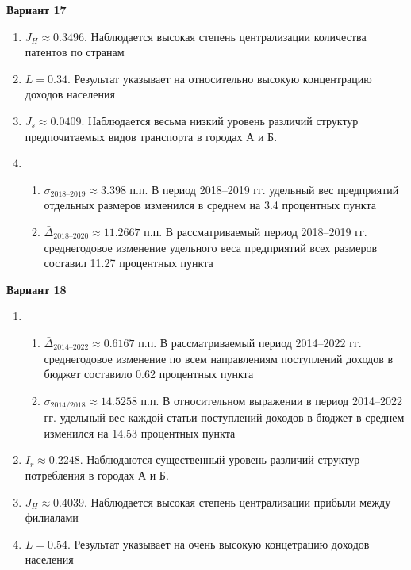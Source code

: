 \documentclass{article}
\begin{document}
\textbf{Вариант 17}
\begin{enumerate}
\item $J_H \approx 0.3496$. Наблюдается высокая степень централизации количества патентов по странам
\item $L= 0.34$. Результат указывает на относительно высокую концентрацию доходов населения
\item $J_s\approx 0.0409$. Наблюдается весьма низкий уровень различий структур предпочитаемых видов транспорта в городах А и Б.
\item \begin{enumerate} \item $\sigma_\text{2018--2019}\approx 3.398$ п.п. В период 2018--2019 гг. удельный вес предприятий отдельных размеров изменился в среднем на 3.4 процентных пункта
\item $\bar\Delta_\text{2018--2020}\approx 11.2667$ п.п. В рассматриваемый период 2018--2019 гг. среднегодовое изменение удельного веса предприятий всех размеров составил 11.27 процентных пункта\end{enumerate}
\end{enumerate}

\textbf{Вариант 18}
\begin{enumerate}
\item \begin{enumerate} \item $\bar\Delta_\text{2014--2022}\approx 0.6167$ п.п. В рассматриваемый период 2014--2022 гг. среднегодовое изменение по всем направлениям поступлений доходов в бюджет составило 0.62 процентных пункта
\item $\sigma_\text{2014/2018}\approx 14.5258$ п.п. В относительном выражении в период 2014--2022 гг. удельный вес каждой статьи поступлений доходов в бюджет в среднем изменился на 14.53 процентных пункта\end{enumerate}
\item $I_r\approx 0.2248$. Наблюдаются существенный уровень различий структур потребления в городах А и Б.
\item $J_H \approx 0.4039$. Наблюдается высокая степень централизации прибыли между филиалами
\item $L= 0.54$. Результат указывает на очень высокую концетрацию доходов населения
\end{enumerate}
\end{document}
